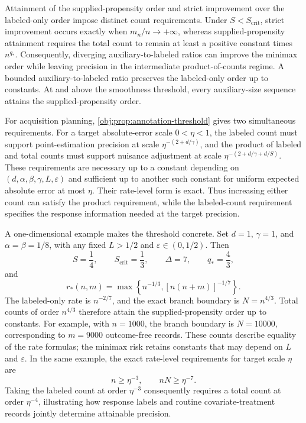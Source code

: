 Attainment of the supplied-propensity order and strict improvement over the labeled-only order impose distinct count requirements. Under \(S<S_{\mathrm{crit}}\), strict improvement occurs exactly when \(m_n/n\to+\infty\), whereas supplied-propensity attainment requires the total count to remain at least a positive constant times \(n^{q_*}\). Consequently, diverging auxiliary-to-labeled ratios can improve the minimax order while leaving precision in the intermediate product-of-counts regime. A bounded auxiliary-to-labeled ratio preserves the labeled-only order up to constants. At and above the smoothness threshold, every auxiliary-size sequence attains the supplied-propensity order.

For acquisition planning, \cref{obj:prop:annotation-threshold} gives two simultaneous requirements. For a target absolute-error scale \(0<\eta<1\), the labeled count must support point-estimation precision at scale \(\eta^{-(2+d/\gamma)}\), and the product of labeled and total counts must support nuisance adjustment at scale \(\eta^{-(2+d/\gamma+d/S)}\). These requirements are necessary up to a constant depending on \((d,\alpha,\beta,\gamma,L,\varepsilon)\) and sufficient up to another such constant for uniform expected absolute error at most \(\eta\). Their rate-level form is exact. Thus increasing either count can satisfy the product requirement, while the labeled-count requirement specifies the response information needed at the target precision.

A one-dimensional example makes the threshold concrete. Set \(d=1\), \(\gamma=1\), and \(\alpha=\beta=1/8\), with any fixed \(L>1/2\) and \(\varepsilon\in(0,1/2)\). Then
\[
S=\frac14,\qquad
S_{\mathrm{crit}}=\frac13,\qquad
\Delta=7,\qquad
q_*=\frac43,
\]
and
\[
r_*(n,m)=\max\left\{n^{-1/3},[n(n+m)]^{-1/7}\right\}.
\]
The labeled-only rate is \(n^{-2/7}\), and the exact branch boundary is \(N=n^{4/3}\). Total counts of order \(n^{4/3}\) therefore attain the supplied-propensity order up to constants. For example, with \(n=1000\), the branch boundary is \(N=10000\), corresponding to \(m=9000\) outcome-free records. These counts describe equality of the rate formulas; the minimax risk retains constants that may depend on \(L\) and \(\varepsilon\). In the same example, the exact rate-level requirements for target scale \(\eta\) are
\[
n\ge\eta^{-3},
\qquad
nN\ge\eta^{-7}.
\]
Taking the labeled count at order \(\eta^{-3}\) consequently requires a total count at order \(\eta^{-4}\), illustrating how response labels and routine covariate-treatment records jointly determine attainable precision.
